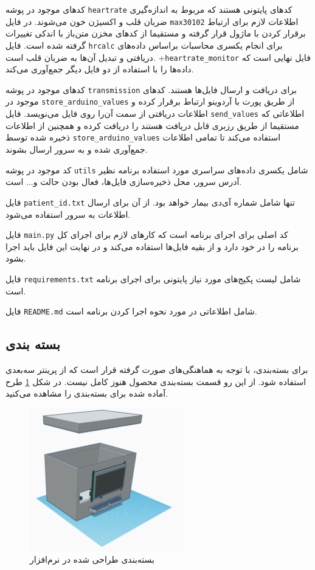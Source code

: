 کدهای موجود در پوشه \verb+heartrate+ کدهای پایتونی هستند که مربوط به اندازه‌گیری ضربان قلب و اکسیژن خون می‌شوند. در فایل \verb+max30102+ اطلاعات لازم برای ارتباط برقرار کردن با ماژول قرار گرفته و مستقیما از کدهای مخزن متن‌باز  با اندکی تغییرات گرفته شده است. فایل \verb+hrcalc+ برای انجام یکسری محاسبات براساس داده‌های دریافتی و تبدیل آن‌ها به ضربان قلب است. +\verb+heartrate_monitor+ فایل نهایی است که داده‌ها را با استفاده از دو فایل دیگر جمع‌آوری می‌کند.

کدهای موجود در پوشه \verb+transmission+ برای دریافت و ارسال فایل‌ها هستند. کدهای موجود در \verb+store_arduino_values+ از طریق پورت  با آردوینو ارتباط برقرار کرده و اطلاعات دریافتی از سمت‌ آن‌را روی فایل می‌نویسد. فایل \verb+send_values+ اطلاعاتی که مستقیما از طریق رزبری قابل دریافت هستند را دریافت کرده و همچنین از اطلاعات ذخیره شده توسط \verb+store_arduino_values+ استفاده می‌کند تا تمامی اطلاعات جمع‌آوری شده و به سرور ارسال بشوند.

کد موجود در پوشه \verb+utils+ شامل یکسری داده‌های سراسری مورد استفاده برنامه نظیر آدرس سرور، محل ذخیره‌سازی فایل‌ها، فعال بودن حالت  و... است.

فایل \verb+patient_id.txt+ تنها شامل شماره آی‌دی بیمار خواهد بود. از آن برای ارسال اطلاعات به سرور استفاده می‌شود.

فایل \verb+main.py+ کد اصلی برای اجرای برنامه است که کارهای لازم برای اجرای کل برنامه را در خود دارد و از بقیه فایل‌ها استفاده می‌کند و در نهایت این فایل باید اجرا بشود.
 
فایل \verb+requirements.txt+ شامل لیست پکیج‌های مورد نیاز پایتونی برای اجرای برنامه است.

فایل \verb+README.md+ شامل اطلاعاتی در مورد نحوه اجرا کردن برنامه است.




\subsection{بسته بندی}

برای بسته‌بندی، با توجه به هماهنگی‌های صورت گرفته قرار است که از پرینتر سه‌بعدی استفاده شود. از این رو قسمت بسته‌بندی محصول هنوز کامل نیست. در شکل \ref{fig:9} طرح آماده شده برای بسته‌بندی را مشاهده می‌کنید.

\begin{figure}[h]
	\centering
	\includegraphics[width=0.6\textwidth]{figs/package.png}
	
	\caption{بسته‌بندی طراحی شده در نرم‌افزار }
	\label{fig:9}
\end{figure}

